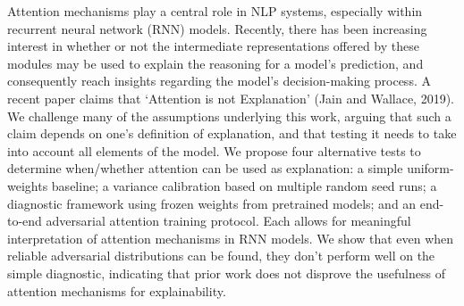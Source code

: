 Attention mechanisms play a central role in NLP systems, especially within recurrent neural network (RNN) models. Recently, there has been increasing interest in whether or not the intermediate representations offered by these modules may be used to explain the reasoning for a model's prediction, and consequently reach insights regarding the model's decision-making process. A recent paper claims that `Attention is not Explanation' (Jain and Wallace, 2019). We challenge many of the assumptions underlying this work, arguing that such a claim depends on one's definition of explanation, and that testing it needs to take into account all elements of the model. We propose four alternative tests to determine when/whether attention can be used as explanation: a simple uniform-weights baseline; a variance calibration based on multiple random seed runs; a diagnostic framework using frozen weights from pretrained models; and an end-to-end adversarial attention training protocol. Each allows for meaningful interpretation of attention mechanisms in RNN models. We show that even when reliable adversarial distributions can be found, they don't perform well on the simple diagnostic, indicating that prior work does not disprove the usefulness of attention mechanisms for explainability.